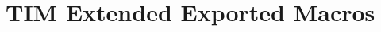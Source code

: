 \hypertarget{group___t_i_m_ex___exported___macros}{}\section{T\+IM Extended Exported Macros}
\label{group___t_i_m_ex___exported___macros}
